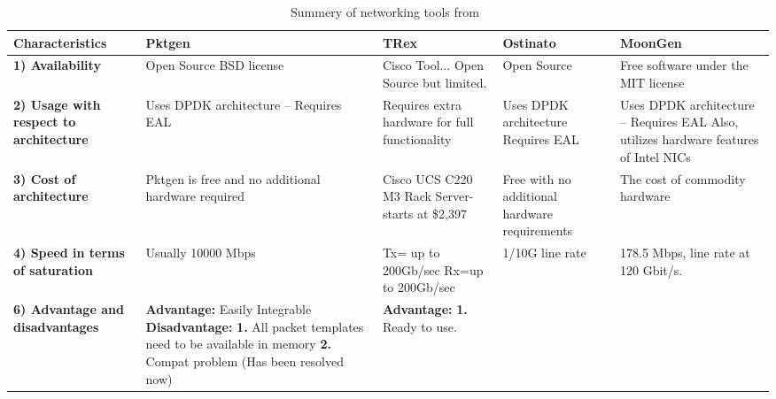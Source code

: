 \begin{table}[ht!]
    \scriptsize
    \caption{Summery of networking tools from~\cite{mahalakshmi2016study}}
    \label{trexsummary}
    \begin{adjustbox}{width=1.25\textwidth, center}
        \renewcommand*\arraystretch{1.5}\begin{tabular}{| L{3cm} | L{3cm} | L{3cm} | L{3cm} | L{3cm} |}
            \hline
            \textbf{Characteristics} & \textbf{Pktgen} & \textbf{TRex} & \textbf{Ostinato} & \textbf{MoonGen} \\ \hline
            \textbf{1) Availability} &
            Open Source BSD license &
            Cisco Tool... Open Source but limited. &
            Open Source &
            Free software under the MIT license
            \\ \hline
            \textbf{2) Usage with respect to architecture} &
            Uses DPDK architecture -- Requires EAL &
            Requires extra hardware for full functionality &
            Uses DPDK architecture \newline Requires EAL &
            Uses DPDK architecture -- Requires EAL \newline Also, utilizes hardware features of Intel NICs
            \\ \hline
            \textbf{3) Cost of architecture} &
            Pktgen is free and no additional hardware required &
            Cisco UCS C220 M3 \newline Rack Server-starts at \$2,397 &
            Free with no additional hardware requirements &
            The cost of commodity hardware
            \\ \hline
            \textbf{4) Speed in terms of saturation} &
            Usually 10000 Mbps &
            Tx= up to 200Gb/sec Rx=up to 200Gb/sec &
            1/10G line rate &
            178.5 Mbps, line rate at 120 Gbit/s.
            \\ \hline
            \textbf{6) Advantage and disadvantages} &
            \textbf{Advantage:} Easily Integrable \newline
            \textbf{Disadvantage:} \newline
            \textbf{1.} All packet templates need to be available in memory \newline
            \textbf{2.} Compat problem (Has been resolved now) &
            \textbf{Advantage:} \newline
            \textbf{1.} Ready to use. \newline

\end{tabular}
\end{adjustbox}
\end{table}
